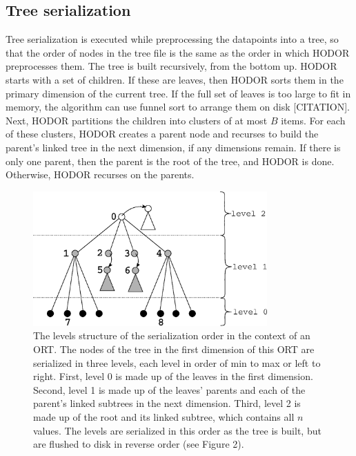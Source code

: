\documentclass[11pt, oneside]{article}
\begin{document}

\subsection{Tree serialization}

Tree serialization is executed while preprocessing the datapoints into a tree,
so that the order of nodes in the tree file is the same as the order in which
HODOR preprocesses them. The tree is built recursively, from the bottom up.
HODOR starts with a set of children. If these are leaves, then HODOR sorts them
in the primary dimension of the current tree. If the full set of leaves is too
large to fit in memory, the algorithm can use funnel sort to arrange them on
disk [CITATION]. Next, HODOR partitions the children into clusters of at most $B$ items.
For each of these clusters, HODOR creates a parent node and recurses to build
the parent's linked tree in the next dimension, if any dimensions remain. If
there is only one parent, then the parent is the root of the tree, and HODOR is
done.  Otherwise, HODOR recurses on the parents.

\begin{figure}[h!]
    \centering
    \vspace{0.5in}
    \includegraphics[width=0.8\textwidth]{fig1.eps}
    \caption{
        The levels structure of the serialization order in the context of an
        ORT. The nodes of the tree in the first dimension of this ORT are
        serialized in three levels, each level in order of min to max or left
        to right. First, level 0 is made up of the leaves in the first
        dimension.  Second, level 1 is made up of the leaves' parents and each
        of the parent's linked subtrees in the next dimension. Third, level 2
        is made up of the root and its linked subtree, which contains all $n$
        values.  The levels are serialized in this order as the tree is built,
        but are flushed to disk in reverse order (see Figure 2).
    }
    \vspace{0.5in}
\end{figure}
\end{document}
